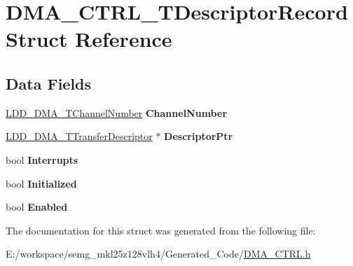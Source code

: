 \hypertarget{struct_d_m_a___c_t_r_l___t_descriptor_record}{\section{D\-M\-A\-\_\-\-C\-T\-R\-L\-\_\-\-T\-Descriptor\-Record Struct Reference}
\label{struct_d_m_a___c_t_r_l___t_descriptor_record}
}
\subsection*{Data Fields}
\begin{DoxyCompactItemize}
\item 
\hypertarget{struct_d_m_a___c_t_r_l___t_descriptor_record_ae184f541d4b8112e3916e3a14dee74b2}{\hyperlink{group___p_e___types__module_gad268d607015891269cb015faa8bc0dac}{L\-D\-D\-\_\-\-D\-M\-A\-\_\-\-T\-Channel\-Number} {\bfseries Channel\-Number}}\label{struct_d_m_a___c_t_r_l___t_descriptor_record_ae184f541d4b8112e3916e3a14dee74b2}

\item 
\hypertarget{struct_d_m_a___c_t_r_l___t_descriptor_record_a5c3ec0767a8703f5e5cd7d3773c2c56f}{\hyperlink{struct_l_d_d___d_m_a___t_transfer_descriptor}{L\-D\-D\-\_\-\-D\-M\-A\-\_\-\-T\-Transfer\-Descriptor} $\ast$ {\bfseries Descriptor\-Ptr}}\label{struct_d_m_a___c_t_r_l___t_descriptor_record_a5c3ec0767a8703f5e5cd7d3773c2c56f}

\item 
\hypertarget{struct_d_m_a___c_t_r_l___t_descriptor_record_af333554ab5bb75e6c3a6945838a3e52e}{bool {\bfseries Interrupts}}\label{struct_d_m_a___c_t_r_l___t_descriptor_record_af333554ab5bb75e6c3a6945838a3e52e}

\item 
\hypertarget{struct_d_m_a___c_t_r_l___t_descriptor_record_acb4eddb566d3c702624a61d4a591e2ca}{bool {\bfseries Initialized}}\label{struct_d_m_a___c_t_r_l___t_descriptor_record_acb4eddb566d3c702624a61d4a591e2ca}

\item 
\hypertarget{struct_d_m_a___c_t_r_l___t_descriptor_record_af4f03f1884afa3b731023a283f6a5dfc}{bool {\bfseries Enabled}}\label{struct_d_m_a___c_t_r_l___t_descriptor_record_af4f03f1884afa3b731023a283f6a5dfc}

\end{DoxyCompactItemize}


The documentation for this struct was generated from the following file\-:\begin{DoxyCompactItemize}
\item 
E\-:/workspace/semg\-\_\-mkl25z128vlh4/\-Generated\-\_\-\-Code/\hyperlink{_d_m_a___c_t_r_l_8h}{D\-M\-A\-\_\-\-C\-T\-R\-L.\-h}\end{DoxyCompactItemize}

